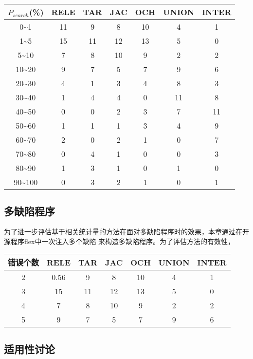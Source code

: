 \begin{center}
\label{tbl:single-flex}
\begin{tabular}{ccccccc}
\toprule
$P_{search}$(\%) & RELE & TAR & JAC & OCH & UNION & INTER\\ \hline
0\textasciitilde1 & 11 & 9 & 8 & 10 & 4 & 1 \\ 
1\textasciitilde5 & 15 & 11 & 12 & 13 & 5 & 0 \\ 
5\textasciitilde10 & 7 & 8 & 10 & 9 & 2 & 2 \\ 
10\textasciitilde20 & 9 & 7 & 5 & 7 & 9 & 6 \\ 
20\textasciitilde30 & 4 & 1 & 3 & 4 & 8 & 3 \\ 
30\textasciitilde40 & 1 & 4 & 4 & 0 & 11 & 8 \\ 
40\textasciitilde50 & 0 & 0 & 2 & 3 & 7 & 11 \\ 
50\textasciitilde60 & 1 & 1 & 1 & 3 & 4 & 9 \\ 
60\textasciitilde70 & 2 & 0 & 2 & 1 & 0 & 7 \\ 
70\textasciitilde80 & 0 & 4 & 1 & 0 & 0 & 3 \\ 
80\textasciitilde90 & 1 & 3 & 1 & 0 & 1 & 0 \\ 
90\textasciitilde100 & 0 & 3 & 2 & 1 & 0 & 1 \\ 
\bottomrule
\end{tabular}
\end{center}

\subsection{多缺陷程序}
为了进一步评估基于相关统计量的方法在面对多缺陷程序时的效果，本章通过在开源程序flex中一次注入多个缺陷
来构造多缺陷程序。为了评估方法的有效性，
\begin{center}
\label{tbl:multi-flex}
\begin{tabular}{ccccccc}
\toprule
错误个数 & RELE & TAR & JAC & OCH & UNION & INTER\\ \hline
2 & 0.56 & 9 & 8 & 10 & 4 & 1 \\ 
3 & 15 & 11 & 12 & 13 & 5 & 0 \\ 
4 & 7 & 8 & 10 & 9 & 2 & 2 \\ 
5 & 9 & 7 & 5 & 7 & 9 & 6 \\ 

\bottomrule
\end{tabular}
\end{center}
\subsection{适用性讨论}

